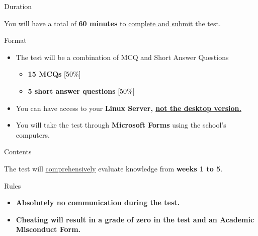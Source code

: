 \begin{step}{Duration}

    You will have a total of \textbf{60 minutes} to \underline{complete and submit} the test.

\end{step}

\begin{step}{Format}

    \begin{itemize}

        \item The test will be a combination of MCQ and Short Answer Questions

        \begin{itemize}
        
        \item \textbf{15 MCQs} [50\%] 

        \item \textbf{5 short answer questions} [50\%] 
            
        \end{itemize}
        
        \item You can have access to your \textbf{Linux Server, \underline{not the desktop version.}}

        \item You will take the test through \textbf{Microsoft Forms} using the school's computers.

    \end{itemize}
    
\end{step}

\begin{step}{Contents}
    
    The test will \underline{comprehensively} evaluate knowledge from \textbf{weeks 1 to 5}.

\end{step}


\begin{step}{Rules}
    
    \begin{itemize}

        \item \textbf{Absolutely no communication during the test.}

        \item \textbf{Cheating will result in a grade of zero in the test and an Academic Misconduct Form.}

    \end{itemize}

\end{step}

